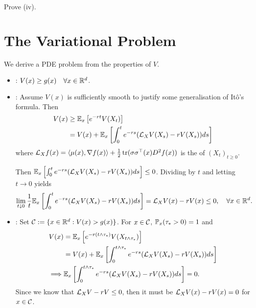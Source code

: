 \begin{homework}
    Prove (iv).
\end{homework}

\section{The Variational Problem}

We derive a PDE problem from the properties of $V$.

\begin{itemize}
    \item {}: $V(x) \geq g(x) \quad \forall x \in \mathbb R^d$.
    \item {}: Assume $V(x)$ is sufficiently smooth to justify some generalisation of Itô's formula. Then
    \begin{align*}
        V(x) &\geq \mathbb E_x \left[ e^{-rt} V(X_t) \right] \\
        &= V(x) + \mathbb E_x \left[ \int_0^t e^{-rs} (\mathcal{L}_X V(X_s) - rV(X_s)) ds \right]
    \end{align*}
    where $\mathcal{L}_X f(x) = \langle \mu(x), \nabla f(x) \rangle + \frac{1}{2} \operatorname{tr}(\sigma\sigma^\top(x) D^2 f(x))$ is the  of $(X_t)_{t \geq 0}$.
    
    Then $\mathbb E_x \left[ \int_0^t e^{-rs} (\mathcal{L}_X V(X_s) - rV(X_s)) ds \right] \leq 0$. Dividing by $t$ and letting $t \to 0$ yields
    \begin{equation*}
        \lim_{t \downarrow 0} \frac{1}{t} \mathbb E_x \left[ \int_0^t e^{-rs} (\mathcal{L}_X V(X_s) - rV(X_s)) ds \right] = \mathcal{L}_X V(x) - rV(x) \leq 0, \quad \forall x \in \mathbb R^d.
    \end{equation*}
    
    \item {}: Set $\mathcal{C} := \{ x \in \mathbb R^d : V(x) > g(x) \}$. For $x \in \mathcal{C}$, $\mathbb P_x(\tau_* > 0) = 1$ and
    \begin{align*}
        V(x) &= \mathbb E_x \left[ e^{-r(t \wedge \tau_*)} V(X_{t \wedge \tau_*}) \right] \\
        &= V(x) + \mathbb E_x \left[ \int_0^{t \wedge \tau_*} e^{-rs} (\mathcal{L}_X V(X_s) - rV(X_s)) ds \right] \\
        \implies &\mathbb E_x \left[ \int_0^{t \wedge \tau_*} e^{-rs} (\mathcal{L}_X V(X_s) - rV(X_s)) ds \right] = 0.
    \end{align*}
    Since we know that $\mathcal{L}_X V - rV \leq 0$, then it must be $\mathcal{L}_X V(x) - rV(x) = 0$ for $x \in \mathcal{C}$.
    

\end{itemize}

